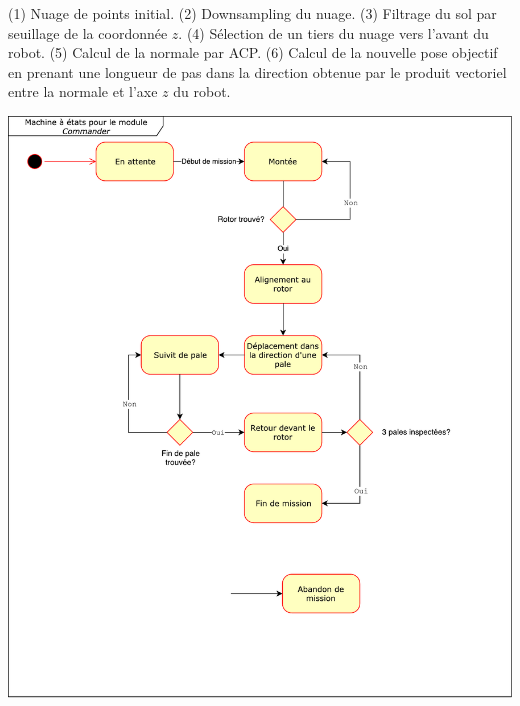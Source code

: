 (1) Nuage de points initial. (2) Downsampling du nuage. (3) Filtrage du sol par seuillage de la coordonnée $z$. (4) Sélection de un tiers du nuage vers l'avant du robot. (5) Calcul de la normale par ACP. (6) Calcul de la nouvelle pose objectif en prenant une longueur de pas dans la direction obtenue par le produit vectoriel entre la normale et l'axe $z$ du robot.

\includegraphics[width=\linewidth]{images/state_machine.pdf}
\label{annexe:state_machine}



%
